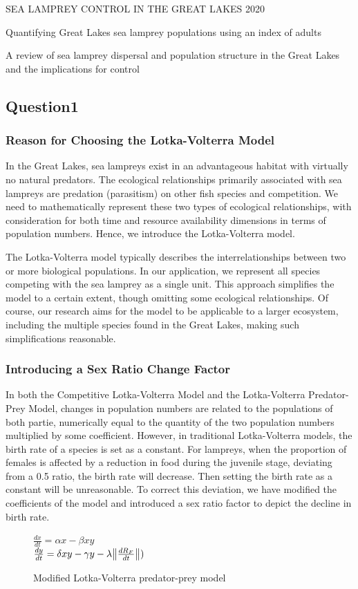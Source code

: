 \documentclass[12pt]{article}
\begin{document}
SEA LAMPREY CONTROL IN THE GREAT LAKES 2020\cite{barber_sea_nodate}

Quantifying Great Lakes sea lamprey populations using an index of adults\cite{adams_quantifying_2021}

A review of sea lamprey dispersal and population structure in the Great Lakes and the implications for control\cite{docker_review_2021}

\subsection{Question1}
\subsubsection{Reason for Choosing the Lotka-Volterra Model}

In the Great Lakes, sea lampreys exist in an advantageous habitat with virtually no natural predators.
The ecological relationships primarily associated with sea lampreys are predation (parasitism) on other
fish species and competition. We need to mathematically represent these two types of ecological
relationships, with consideration for both time and resource availability dimensions in terms of
population numbers. Hence, we introduce the Lotka-Volterra model.

The Lotka-Volterra model typically describes the interrelationships between two or more biological
populations. In our application, we represent all species competing with the sea lamprey as a single
unit. This approach simplifies the model to a certain extent, though omitting some ecological
relationships. Of course, our research aims for the model to be applicable to a larger ecosystem,
including the multiple species found in the Great Lakes, making such simplifications reasonable.

\subsubsection{Introducing a Sex Ratio Change Factor}
In both the Competitive Lotka-Volterra Model and the Lotka-Volterra Predator-Prey Model, changes
in population numbers are related to the populations of both partie, numerically equal to the
quantity of the two population numbers multiplied by some coefficient. However, in traditional
Lotka-Volterra models, the birth rate of a species is set as a constant. For lampreys, when the
proportion of females is affected by a reduction in food during the juvenile stage, deviating
from a 0.5 ratio, the birth rate will decrease. Then setting the birth rate as a constant will
be unreasonable. To correct this deviation, we have modified the coefficients of the model and
introduced a sex ratio factor to depict the decline in birth rate.
\begin{figure}[ht]
	\large
	\centering
	$\frac{dx}{dt}=\alpha x - \beta xy$ \\
	$\frac{dy}{dt}=\delta xy - \gamma y-\lambda \norm{\frac{dR_F}{dt}})$
	\caption*{Modified Lotka-Volterra predator-prey model}
\end{figure}
\end{document}
